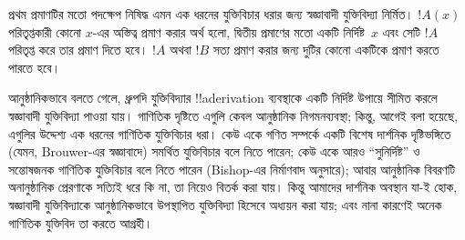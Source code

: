 \documentclass[../../../include/open-logic-chapter]{subfiles}
\begin{document}
প্রথম প্রমাণটির মতো পদক্ষেপ নিষিদ্ধ এমন এক ধরনের যুক্তিবিচার ধরার
জন্য স্বজ্ঞাবাদী যুক্তিবিদ্যা নির্মিত। $!A(x)$ পরিতৃপ্তকারী কোনো
$x$-এর অস্তিত্ব প্রমাণ করার অর্থ হলো, দ্বিতীয় প্রমাণের মতো একটি
নির্দিষ্ট~$x$ এবং সেটি $!A$ পরিতৃপ্ত করে তার প্রমাণ দিতে হবে। $!A$
অথবা $!B$ সত্য প্রমাণ করার জন্য দুটির কোনো একটিকে প্রমাণ করতে পারতে
হবে।

আনুষ্ঠানিকভাবে বলতে গেলে, ধ্রুপদি যুক্তিবিদ্যার !!a{derivation}
ব্যবস্থাকে একটি নির্দিষ্ট উপায়ে সীমিত করলে স্বজ্ঞাবাদী যুক্তিবিদ্যা
পাওয়া যায়। গাণিতিক দৃষ্টিতে এগুলি কেবল আনুষ্ঠানিক নিগমনব্যবস্থা;
কিন্তু, আগেই বলা হয়েছে, এগুলির উদ্দেশ্য এক ধরনের গাণিতিক যুক্তিবিচার
ধরা। কেউ একে গণিত সম্পর্কে একটি বিশেষ দার্শনিক দৃষ্টিভঙ্গিতে (যেমন,
Brouwer-এর স্বজ্ঞাবাদে) সমর্থিত যুক্তিবিচার বলে নিতে পারেন; কেউ একে
আরও ``সুনির্দিষ্ট'' ও সন্তোষজনক গাণিতিক যুক্তিবিচার বলে নিতে পারেন
(Bishop-এর নির্মাণবাদ অনুসারে); আবার আনুষ্ঠানিক বিবরণটি অনানুষ্ঠানিক
প্রেরণাকে সত্যিই ধরে কি না, তা নিয়েও বিতর্ক করা যায়। কিন্তু আমাদের
দার্শনিক অবস্থান যা-ই হোক, স্বজ্ঞাবাদী যুক্তিবিদ্যাকে আনুষ্ঠানিকভাবে
উপস্থাপিত যুক্তিবিদ্যা হিসেবে অধ্যয়ন করা যায়; এবং নানা কারণেই অনেক
গাণিতিক যুক্তিবিদ তা করতে আগ্রহী।
\end{document}
